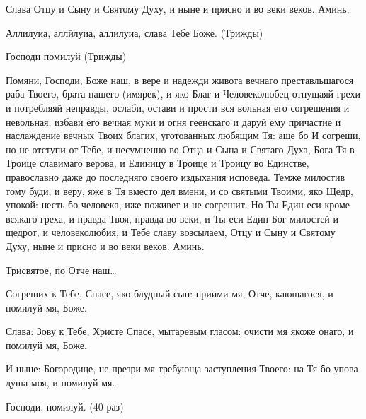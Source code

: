 \begin{mymulticols}
Слава Отцу и Сыну и Святому Духу, и ныне и присно и во веки веков. Аминь. 

Аллилуиа, аллйлуиа, аллилуиа, слава Тебе Боже. (Трижды) 

Господи помилуй (Трижды)




Помяни, Господи, Боже наш, в вере и надежди живота вечнаго преставльшагося раба Твоего, брата нашего (имярек), и яко Благ и Человеколюбец отпущаяй грехи и потребляяй неправды, ослаби, остави и прости вся вольная его согрешения и невольная, избави его вечная муки и огня геенскаго и даруй ему причастие и наслаждение вечных Твоих благих, уготованных любящим Тя: аще бо И согреши, но не отступи от Тебе, и несумненно во Отца и Сына и Святаго Духа, Бога Тя в Троице славимаго верова, и Единицу в Троице и Троицу во Единстве, православно даже до последняго своего издыхания исповеда. Темже милостив тому буди, и веру, яже в Тя вместо дел вмени, и со святыми Твоими, яко Щедр, упокой: несть бо человека, иже поживет и не согрешит. Но Ты Един еси кроме всякаго греха, и правда Твоя, правда во веки, и Ты еси Един Бог милостей и щедрот, и человеколюбия, и Тебе славу возсылаем, Отцу и Сыну и Святому Духу, ныне и присно и во веки веков. Аминь. 


Трисвятое, по Отче наш… 


Согреших к Тебе, Спасе, яко блудный сын: приими мя, Отче, кающагося, и помилуй мя, Боже. 

Слава: Зову к Тебе, Христе Спасе, мытаревым гласом: очисти мя якоже онаго, и помилуй мя, Боже. 

И ныне: Богородице, не презри мя требующа заступления Твоего: на Тя бо упова душа моя, и помилуй мя. 

Господи, помилуй. (40 раз)





\end{mymulticols}
